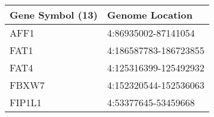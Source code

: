 \begin{tabular}{ll}
\toprule
Gene Symbol (13) &       Genome Location \\
\midrule
            AFF1 &   4:86935002-87141054 \\
            FAT1 & 4:186587783-186723855 \\
            FAT4 & 4:125316399-125492932 \\
           FBXW7 & 4:152320544-152536063 \\
          FIP1L1 &   4:53377645-53459668 \\
\bottomrule
\end{tabular}
